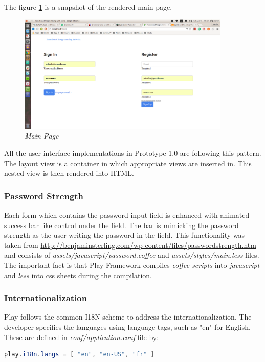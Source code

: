 \documentclass[12pt,twoside,a4paper]{report}
\begin{document}
The figure \ref{f4.3.1.3} is a snapshot of the rendered main page.

\begin{figure}[!ht]
	\centering
		\includegraphics[width=0.9\textwidth, totalheight=8cm]
		{main_page_view}
	\caption{\textit{Main Page}}
	\label{f4.3.1.3}
\end{figure}

All the user interface implementations in Prototype 1.0 are following this pattern. The layout view is a container in which appropriate views are inserted in. This nested view is then rendered into HTML.

\subsubsection{Password Strength}\label{4.3.1.3}
Each form which contains the password input field is enhanced with animated success bar like control under the field. The bar is mimicking the password strength as the user writing the password in the field. This functionality was taken from \url{http://benjaminsterling.com/wp-content/files/passwordstrength.htm} and consists of \emph{assets/javascript/password.coffee} and \emph{assets/styles/main.less} files. The important fact is that Play Framework compiles \emph{coffee scripts} into \emph{javascript} and \emph{less} into css sheets during the compilation.

\subsubsection{Internationalization}\label{4.3.1.4}

Play follows the common I18N scheme to address the internationalization. The developer specifies the languages using language tags, such as "en" for English. These are defined in \emph{conf/application.conf} file by:
\begin{lstlisting}[language=java]
	play.i18n.langs = [ "en", "en-US", "fr" ]
\end{lstlisting}
\end{document}
